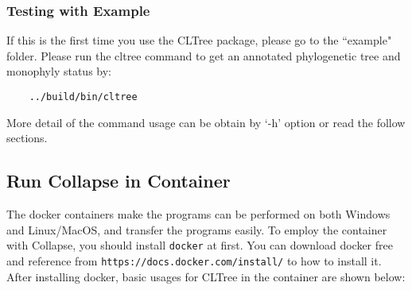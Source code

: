 \documentclass[12pt,a4paper]{article}
\begin{document}
\subsubsection{Testing with Example}
If this is the first time you use the CLTree package, please go to the ``example" folder. Please run the cltree command to get an annotated phylogenetic tree and monophyly status by:

\begin{verbatim}
    ../build/bin/cltree
\end{verbatim}
More detail of the command usage can be obtain by `-h' option or read the follow sections.

\subsection{Run Collapse in Container} 

The docker containers make the programs can be performed on both Windows and Linux/MacOS, and transfer the programs easily. To employ the container with Collapse, you should install {\tt docker} at first. You can download docker free and reference from {\tt https://docs.docker.com/install/} to how to install it. After installing docker, basic usages for CLTree in the container are shown below:
\end{document}
